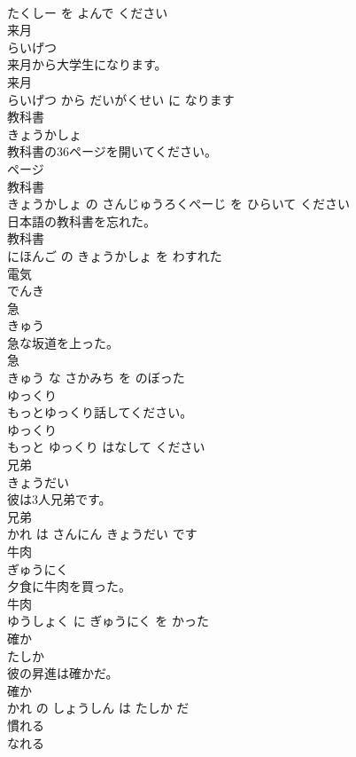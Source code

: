 \documentclass[8pt]{extreport}
\begin{document}
\begin{CJK}{UTF8}{min}
\\	たくしー を よんで ください			
\\	来月	
\\	らいげつ			
\\	来月から大学生になります。	
\\	来月 
\\	らいげつ から だいがくせい に なります			
\\	教科書	
\\	きょうかしょ			
\\	教科書の36ページを開いてください。	
\\	ページ 
\\	教科書 
\\	きょうかしょ の さんじゅうろくぺーじ を ひらいて ください			
\\	日本語の教科書を忘れた。	
\\	教科書 
\\	にほんご の きょうかしょ を わすれた			
\\	電気	
\\	でんき			
\\	急	
\\	きゅう			
\\	急な坂道を上った。	
\\	急 
\\	きゅう な さかみち を のぼった			
\\	ゆっくり	
\\	もっとゆっくり話してください。	
\\	ゆっくり 
\\	もっと ゆっくり はなして ください			
\\	兄弟	
\\	きょうだい			
\\	彼は3人兄弟です。	
\\	兄弟 
\\	かれ は さんにん きょうだい です			
\\	牛肉	
\\	ぎゅうにく			
\\	夕食に牛肉を買った。	
\\	牛肉 
\\	ゆうしょく に ぎゅうにく を かった			
\\	確か	
\\	たしか			
\\	彼の昇進は確かだ。	
\\	確か 
\\	かれ の しょうしん は たしか だ			
\\	慣れる	
\\	なれる			

\end{CJK}
\end{document}

